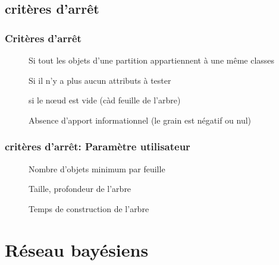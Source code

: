 \section{critères d'arrêt}

\subsection{Critères d'arrêt}
\begin{description}
\item[] Si tout les objets d'une partition appartiennent à une même classes
\item[] Si il n'y a plus aucun attributs à tester
\item[] si le nœud est vide (càd feuille de l'arbre)
\item[] Absence d'apport informationnel (le grain est négatif ou nul)
\end{description}

\subsection{critères d'arrêt: Paramètre utilisateur}
\begin{description}
\item[] Nombre d'objets minimum par feuille
\item[] Taille, profondeur de l'arbre
\item[] Temps de construction de l'arbre
\end{description}

\chapter{Réseau bayésiens}
